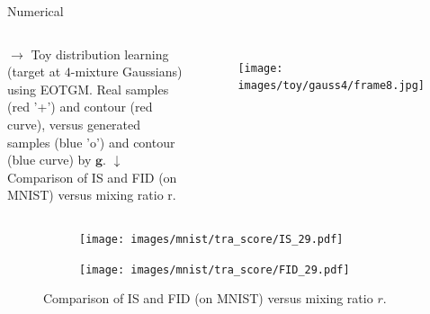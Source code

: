 \begin{frame}{Numerical}
  \begin{columns}
    \vskip 0.5cm
    {\tiny $\bm{\rightarrow}$ Toy distribution learning (target at $4$-mixture Gaussians) using EOTGM. Real samples (red '+') and contour
      (red curve), versus generated samples (blue 'o') and contour (blue curve) by $\bm{g}$.
      \vskip 0.2cm
      $\bm{\downarrow}$
      Comparison of IS and FID (on MNIST) versus mixing ratio r.
    }
    
    \begin{figure}
      \centering
      \texttt{[image: images/toy/gauss4/frame8.jpg]}
    \end{figure}
  \end{columns}
  \vskip -0.4cm
  \begin{figure}[!ht]
    \captionsetup[subfigure]{justification=centering}

    \begin{subfigure}[b]{0.44\textwidth}
      \centering
      \texttt{[image: images/mnist/tra\_score/IS\_29.pdf]}\vspace{-3pt}
    \end{subfigure}
    \vspace{20pt}  
    \begin{subfigure}[b]{0.44\textwidth}
      \centering
      \texttt{[image: images/mnist/tra\_score/FID\_29.pdf]}\vspace{-3pt}
      
    \end{subfigure}
    \captionsetup{labelformat=empty,justification=centering}
    \caption{Comparison of IS and FID (on MNIST) versus mixing ratio $r$. %
    }\vspace{-1cm}
    
  \end{figure}

\end{frame}

